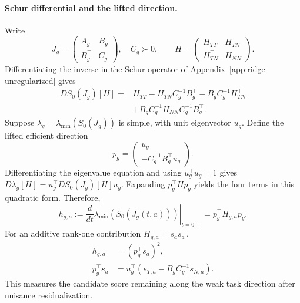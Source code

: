 \paragraph{Schur differential and the lifted direction.}
Write
\begin{equation}
J_g=\begin{pmatrix}A_g&B_g\\B_g^\top&C_g\end{pmatrix},
\quad C_g\succ0,
\qquad
H=\begin{pmatrix}H_{TT}&H_{TN}\\H_{TN}^\top&H_{NN}\end{pmatrix}.
\label{eq:influence-block-partition}
\end{equation}
Differentiating the inverse in the Schur operator of Appendix~\ref{app:ridge-unregularized} gives
\begin{equation}
\begin{aligned}
DS_0(J_g)[H]
={}&H_{TT}-H_{TN}C_g^{-1}B_g^\top
-B_gC_g^{-1}H_{TN}^\top\\
&+B_gC_g^{-1}H_{NN}C_g^{-1}B_g^\top.
\end{aligned}
\label{eq:influence-schur-differential}
\end{equation}
Suppose $\lambda_g=\lambda_{\min}(S_0(J_g))$ is simple, with unit eigenvector $u_g$. Define the lifted efficient direction
\begin{equation}
p_g=\begin{pmatrix}u_g\\-C_g^{-1}B_g^\top u_g\end{pmatrix}.
\label{eq:influence-efficient-lift}
\end{equation}
Differentiating the eigenvalue equation and using $u_g^\top u_g=1$ gives $D\lambda_g[H]=u_g^\top DS_0(J_g)[H]u_g$. Expanding $p_g^\top Hp_g$ yields the four terms in this quadratic form. Therefore,
\begin{equation}
\boxed{
h_{g,a}:=
\left.\frac{d}{dt}\lambda_{\min}(S_0(J_g(t,a)))\right|_{t=0+}
=p_g^\top H_{g,a}p_g.
}
\label{eq:directional-schur-derivative}
\end{equation}
For an additive rank-one contribution $H_{g,a}=s_as_a^\top$,
\begin{equation}
\begin{aligned}
h_{g,a}&=(p_g^\top s_a)^2,\\
p_g^\top s_a
&=u_g^\top(s_{T,a}-B_gC_g^{-1}s_{N,a}).
\end{aligned}
\label{eq:influence-rank-one-gain}
\end{equation}
This measures the candidate score remaining along the weak task direction after nuisance residualization.

